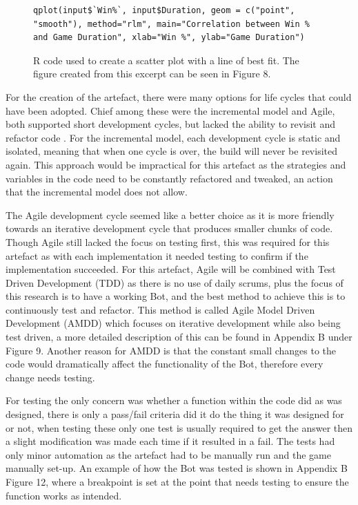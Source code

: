 \documentclass[journal]{IEEEtran}
\begin{document}
	\begin{figure}[H]
\begin{lstlisting}
qplot(input$`Win%`, input$Duration, geom = c("point",
"smooth"), method="rlm", main="Correlation between Win % and Game Duration", xlab="Win %", ylab="Game Duration")
\end{lstlisting}
		\caption{R code used to create a scatter plot with a line of best fit. The figure created from this excerpt can be seen in Figure 8.}
		\label{Fig3}
\end{figure}
	
	For the creation of the artefact, there were many options for life cycles that could have been adopted. Chief among these were the incremental model and Agile, both supported short development cycles, but lacked the ability to revisit and refactor code \cite{Life}. For the incremental model, each development cycle is static and isolated, meaning that when one cycle is over, the build will never be revisited again. This approach would be impractical for this artefact as the strategies and variables in the code need to be constantly refactored and tweaked, an action that the incremental model does not allow.
	
	The Agile development cycle seemed like a better choice as it is more friendly towards an iterative development cycle that produces smaller chunks of code. Though Agile still lacked the focus on testing first, this was required for this artefact as with each implementation it needed testing to confirm if the implementation succeeded. For this artefact, Agile will be combined with Test Driven Development (TDD) as there is no use of daily scrums, plus the focus of this research is to have a working Bot, and the best method to achieve this is to continuously test and refactor. This method is called Agile Model Driven Development (AMDD) which focuses on iterative development while also being test driven, a more detailed description of this can be found in Appendix B under Figure 9. Another reason for AMDD is that the constant small changes to the code would dramatically affect the functionality of the Bot, therefore every change needs testing.
	
	For testing the only concern was whether a function within the code did as was designed, there is only a pass/fail criteria did it do the thing it was designed for or not, when testing these only one test is usually required to get the answer then a slight modification was made each time if it resulted in a fail. The tests had only minor automation as the artefact had to be manually run and the game manually set-up. An example of how the Bot was tested is shown in Appendix B Figure 12, where a breakpoint is set at the point that needs testing to ensure the function works as intended.
	\newline
	
\end{document}

